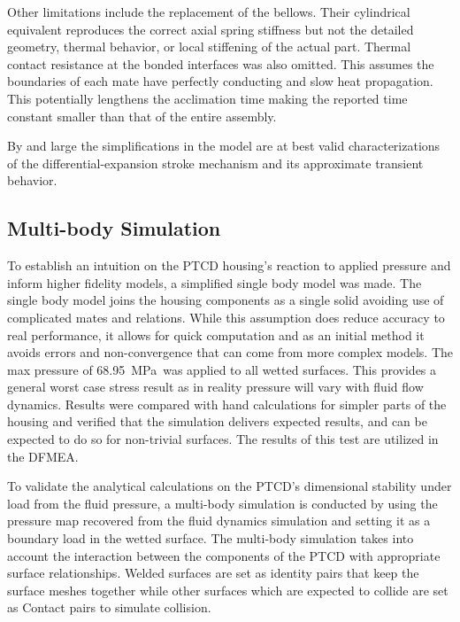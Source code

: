 \documentclass[12pt, letterpaper]{report}%
\newcounter{mycounter}           %
\newcounter{sub}[mycounter]      %
\newcommand{\specPressure}{\SI{68.95}{\mega \pascal}}%
\begin{document}
			Other limitations include the replacement of the bellows. Their cylindrical
			equivalent reproduces the correct axial spring stiffness but not the detailed
			geometry, thermal behavior, or local stiffening of the actual part. Thermal
			contact resistance at the bonded interfaces was also omitted. This assumes the
			boundaries of each mate have perfectly conducting and slow heat propagation.
			This potentially lengthens the acclimation time making the reported time
			constant smaller than that of the entire assembly.

			By and large the simplifications in the model are at best valid characterizations
			of the differential-expansion stroke mechanism and its approximate transient
			behavior.

		\subsection{Multi-body Simulation}

			To establish an intuition on the PTCD housing's reaction to applied pressure
			and inform higher fidelity models, a simplified single body model was made. The
			single body model joins the housing components as a single solid avoiding use of
			complicated mates and relations. While this assumption does reduce accuracy to
			real performance, it allows for quick computation and as an initial method it
			avoids errors and non-convergence that can come from more complex models. The
			max pressure of \specPressure\ was applied to all wetted surfaces. This provides
			a general worst case stress result as in reality pressure will vary with fluid
			flow dynamics. Results were compared with hand calculations for simpler parts of
			the housing and verified that the simulation delivers expected results, and can
			be expected to do so for non-trivial surfaces. The results of this test are
			utilized in the DFMEA.

			To validate the analytical calculations on the PTCD's dimensional stability
			under load from the fluid pressure, a multi-body simulation is conducted by
			using the pressure map recovered from the fluid dynamics simulation and setting
			it as a boundary load in the wetted surface.
			The multi-body simulation takes into account the interaction between the
			components of the PTCD with appropriate surface relationships. Welded surfaces
			are set as identity pairs that keep the surface meshes together while other
			surfaces which are expected to collide are set as Contact pairs to simulate
			collision.
\end{document}

